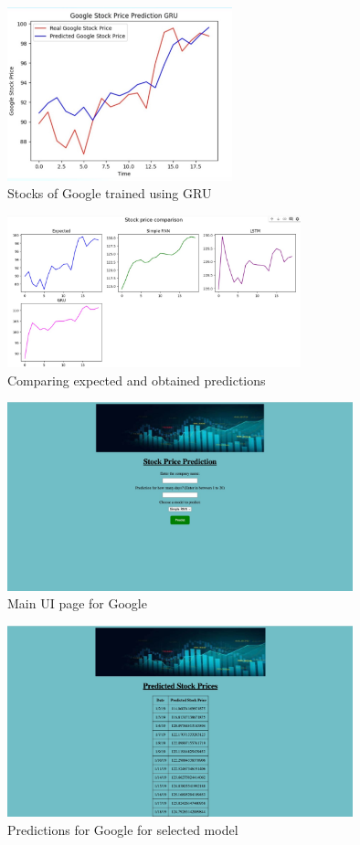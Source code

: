 \documentclass{article}
\begin{document}
\begin{figure}[htp]
    \centering
    \includegraphics[width=6.5cm]{GOOGL_GRU.jpg}
    \caption{Stocks of Google trained using GRU}
\end{figure}
\begin{figure}[htp]
    \centering
    \includegraphics[width=8.5cm]{GOOGL_ALL.jpg}
    \caption{Comparing expected and obtained predictions}
\end{figure}
\begin{figure}[htp]
    \centering
    \includegraphics[width=10cm]{GOOGL_MAIN.jpg}
    \caption{Main UI page for Google}
\end{figure}
\begin{figure}[htp]
    \centering
    \includegraphics[width=10cm]{GOOGL_PRED.jpg}
    \caption{Predictions for Google for selected model}    
\end{figure}
\end{document}
